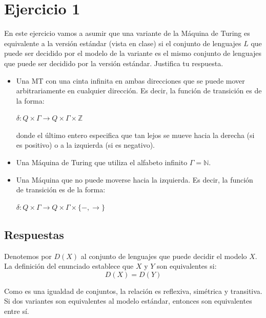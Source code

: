 \section{Ejercicio 1}


\begin{tcolorbox}[enunciado]
En este ejercicio vamos a asumir que una variante de la Máquina de Turing es equivalente a la versión estándar (vista en clase) si el conjunto de lenguajes $L$ que puede ser decidido por el modelo de la variante es el mismo conjunto de lenguajes que puede ser decidido por la versión estándar. Justifica tu respuesta.
\begin{itemize}
    \item Una MT con una cinta infinita en ambas direcciones que se puede mover arbitrariamente en cualquier dirección. Es decir, la función de transición es de la forma:
    \begin{center}
        $\delta:Q\times \Gamma\xrightarrow{}Q\times \Gamma \times \mathbb{Z}$
    \end{center}
    donde el último entero especifica que tan lejos se mueve hacia la derecha (si es positivo) o a la izquierda (si es negativo).
    \item Una Máquina de Turing que utiliza el alfabeto infinito $\Gamma = \mathbb{N}$.
    \item Una Máquina que no puede moverse hacia la izquierda. Es decir, la función de transición es de la forma:\begin{center}
        $\delta:Q \times \Gamma \rightarrow Q \times \Gamma \times \{ -,\rightarrow\}$
    \end{center}
\end{itemize}
\end{tcolorbox}

\subsection{Respuestas}


Denotemos por $D(X)$ al conjunto de lenguajes que puede decidir el modelo $X$. La definición del enunciado establece que $X$ y $Y$ son equivalentes si:
\[
D(X) = D(Y)
\]

Como es una igualdad de conjuntos, la relación es reflexiva, simétrica y transitiva. Si dos variantes son equivalentes al modelo estándar, entonces son equivalentes entre sí.

